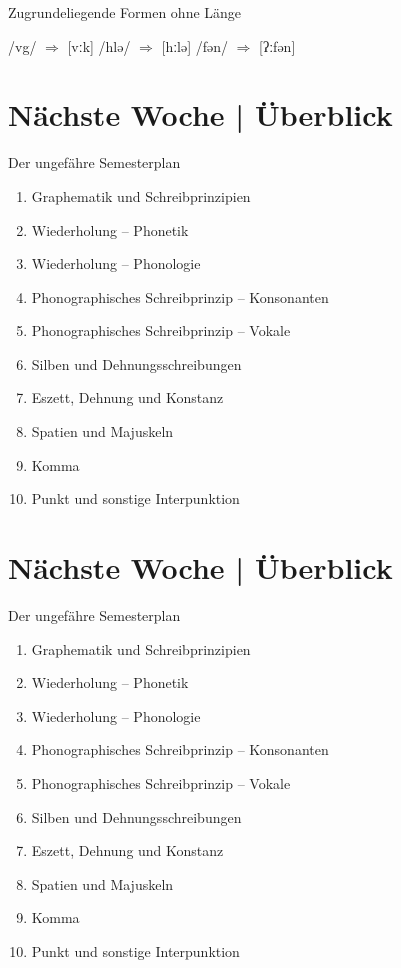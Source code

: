 \begin{frame}
  {Zugrundeliegende Formen ohne Länge}
  \begin{exe}
    \ex\label{ex:gespanntheitbetonungundlaenge028} \begin{xlist}
      \ex /vg/ $\Rightarrow$ [vːk]
      \ex /hlə/ $\Rightarrow$ [hːlə]
      \ex /fən/ $\Rightarrow$ [ʔːfən]
    \end{xlist}
  \end{exe}
\end{frame}

\ifdefined\TITLE
  \section{Nächste Woche | Überblick}

  \begin{frame}
    {Der ungefähre Semesterplan}
    \begin{enumerate}[<+->]
      \item Graphematik und Schreibprinzipien
      \item Wiederholung -- Phonetik
      \item Wiederholung -- Phonologie
      \item \alert{Phonographisches Schreibprinzip -- Konsonanten}
      \item Phonographisches Schreibprinzip -- Vokale
      \item Silben und Dehnungsschreibungen
      \item Eszett, Dehnung und Konstanz
      \item Spatien und Majuskeln
      \item Komma
      \item Punkt und sonstige Interpunktion
    \end{enumerate}
  \end{frame}
\fi


\ifdefined\TITLE
  \section{Nächste Woche | Überblick}

  \begin{frame}
    {Der ungefähre Semesterplan}
    \begin{enumerate}[<+->]
      \item Graphematik und Schreibprinzipien
      \item \alert{Wiederholung -- Phonetik}
      \item Wiederholung -- Phonologie
      \item Phonographisches Schreibprinzip -- Konsonanten
      \item Phonographisches Schreibprinzip -- Vokale
      \item Silben und Dehnungsschreibungen
      \item Eszett, Dehnung und Konstanz
      \item Spatien und Majuskeln
      \item Komma
      \item Punkt und sonstige Interpunktion
    \end{enumerate}
  \end{frame}
\fi
